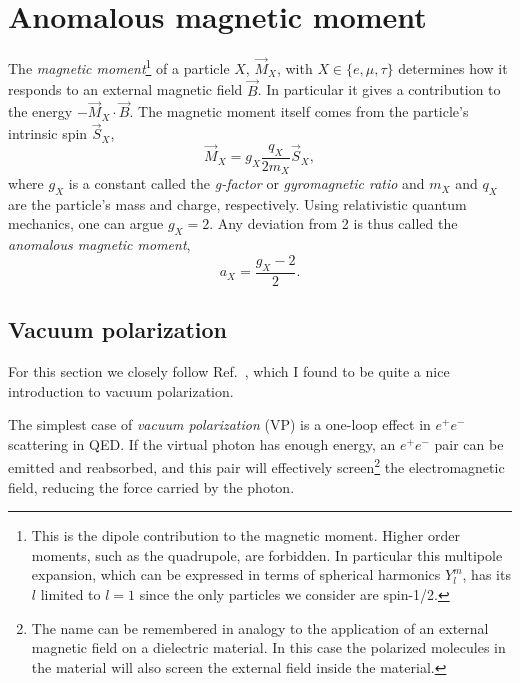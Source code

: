 \section{Anomalous magnetic moment}\label{sec:magAnom}
The {\it magnetic moment}\footnote{This is the dipole contribution to the
magnetic moment. Higher order moments, such as the quadrupole, are forbidden.
In particular this multipole expansion, which can be expressed in
terms of spherical harmonics $Y_l^m$, has its $l$ limited to $l=1$
since the only particles we consider are spin-1/2.} 
of a particle $X$, $\vec{M}_X$,
with $X\in\{e,\mu,\tau\}$
determines how it responds to an external magnetic field $\vec{B}$. In particular it
gives a contribution to the energy $-\vec{M}_X\cdot\vec{B}$.
The magnetic moment itself comes from the particle's intrinsic spin $\vec{S}_X$,
\begin{equation}
  \vec{M}_X=g_X\frac{q_X}{2m_X}\vec{S}_X,
\end{equation}
where $g_X$ is a constant called the {\it g-factor}
or {\it gyromagnetic ratio} and
$m_X$ and $q_X$ are the particle's mass and charge, respectively.
Using relativistic quantum mechanics, one can argue $g_X=2$. Any
deviation from 2 is thus called the {\it anomalous magnetic moment},
\begin{equation}
  a_X=\frac{g_X-2}{2}.
\end{equation}


\subsection{Vacuum polarization}\label{sec:VP}

For this section we closely follow Ref.~\cite{maiani_hadron_2016}, 
which I found to be quite
a nice introduction to vacuum polarization.

The simplest case of {\it vacuum polarization} (VP) is a one-loop effect in
$e^+e^-$ scattering in QED. If the virtual photon has enough energy,
an $e^+e^-$ pair can be emitted and reabsorbed, and this
pair will effectively screen\footnote{The name can be remembered in analogy to
the application of an external magnetic field on a dielectric material.
In this case the polarized molecules in the material will also screen
the external field inside the material.} the electromagnetic field, reducing the force
carried by the photon.

